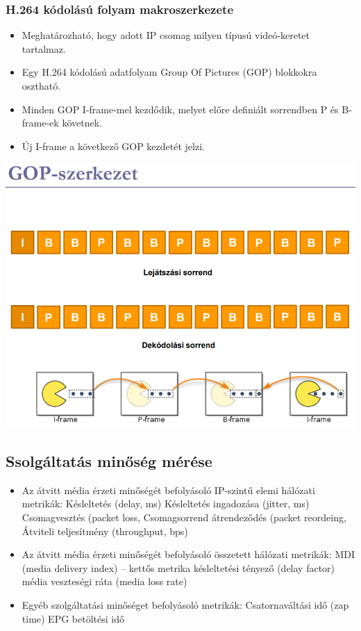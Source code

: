 \documentclass[10pt,a4paper]{article}
\begin{document}
\subsubsection{H.264 kódolású folyam makroszerkezete}
\begin{itemize}
	\item Meghatározható, hogy adott IP csomag milyen
	típusú videó-keretet tartalmaz.
	\item Egy H.264 kódolású adatfolyam Group Of
	Pictures (GOP) blokkokra osztható.
	\item Minden GOP I-frame-mel kezdődik, melyet előre
	definiált sorrendben P és B-frame-ek követnek.
	\item Új I-frame a következő GOP kezdetét jelzi.
\end{itemize}
\begin{center}
	\includegraphics[width=0.6\linewidth]{src/GOPszerk}
\end{center}
\subsection{Ssolgáltatás minőség mérése}
\begin{itemize}
	\item Az átvitt média érzeti minőségét befolyásoló IP-szintű
	elemi hálózati metrikák:
	\subitem Késleltetés (delay, ms)
	\subitem Késleltetés ingadozása (jitter, ms)
	\subitem Csomagvesztés (packet loss, %
	\subitem Csomagsorrend átrendeződés (packet reordeing, %
	\subitem Átviteli teljesítmény (throughput, bps)
	\item Az átvitt média érzeti minőségét befolyásoló összetett
	hálózati metrikák:
	\subitem MDI (media delivery index) – kettős metrika
	\subsubitem késleltetési tényező (delay factor)
	\subsubitem média veszteségi ráta (media loss rate)
	\item Egyéb szolgáltatási minőséget befolyásoló metrikák:
	\subitem Csatornaváltási idő (zap time)
	\subitem EPG betöltési idő
\end{itemize}
\end{document}
